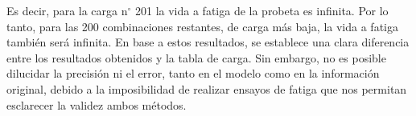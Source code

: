 Es decir, para la carga n$^{\circ}$ 201 la vida a fatiga de la probeta es infinita. Por lo tanto, para las 200 combinaciones restantes, de carga más baja, la vida a fatiga también será infinita. En base a estos resultados, se establece una clara diferencia entre los resultados obtenidos y la tabla de carga. Sin embargo, no es posible dilucidar la precisión ni el error, tanto en el modelo como en la información original, debido a la imposibilidad de realizar ensayos de fatiga que nos permitan esclarecer la validez ambos métodos.

